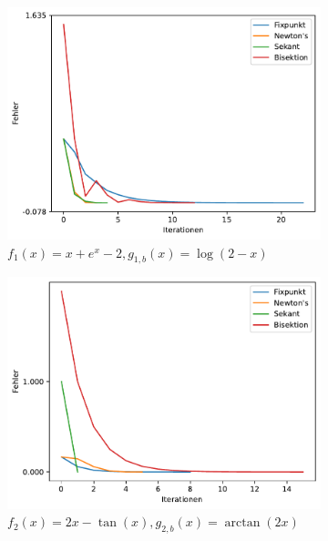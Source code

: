 \documentclass[10pt]{scrartcl}
\newcommand{\1}{1\hspace{-0,9ex}1}
\begin{document}
	\begin{figure}[!h]
		\centering
		\begin{subfigure}[b]{0.4\textwidth}
			\includegraphics[width=\textwidth]{plots/plot.pdf}
			\caption*{$f_1(x) = x + e^x-2, g_{1,b}(x)=\log(2-x)$}
		\end{subfigure}
		\begin{subfigure}[b]{0.4\textwidth}
			\includegraphics[width=\textwidth]{plots/plot1.pdf}
			\caption*{$f_2(x) = 2x - \tan(x), g_{2,b}(x)=\arctan(2x)$}
		\end{subfigure}
		\begin{subfigure}[b]{0.4\textwidth}

\end{subfigure}
\end{figure}
\end{document}
